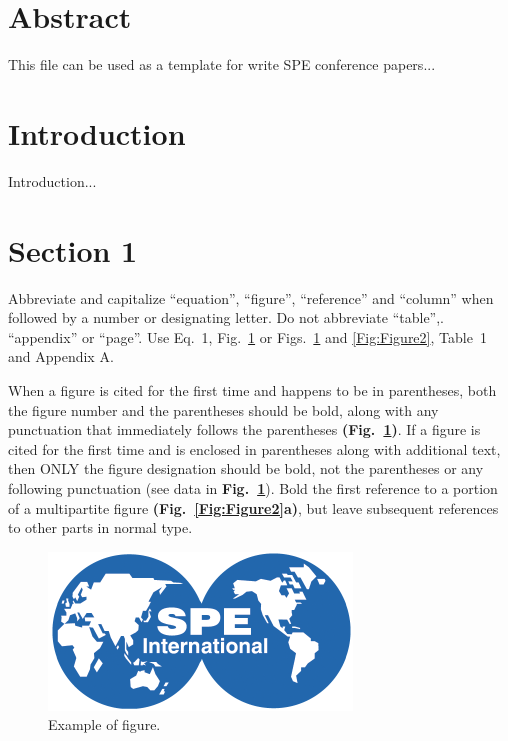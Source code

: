 \documentclass[10pt,twoside]{article}
\begin{document}
\section*{Abstract}
\label{Sec:Abstract}

This file can be used as a template for write SPE conference papers...

\section{Introduction}
\label{Sec:Intro}

Introduction...  \citep{RefWorks:25}

\section{Section 1}
\label{Sec:Section1}

Abbreviate and capitalize ``equation'', ``figure'', ``reference'' and ``column'' when followed by a number or designating letter. Do not abbreviate ``table'',. ``appendix'' or ``page''. Use Eq.~1, Fig.~\ref{Fig:Figure1} or Figs.~\ref{Fig:Figure1} and \ref{Fig:Figure2}, Table~1 and Appendix A.

When a figure is cited for the first time and happens to be in parentheses, both the figure number and the parentheses should be bold, along with any punctuation that immediately follows the parentheses \textbf{(Fig.~\ref{Fig:Figure1})}. If a figure is cited for the first time and is enclosed in parentheses along with additional text, then ONLY the figure designation should be bold, not the parentheses or any following punctuation (see data in \textbf{Fig.~\ref{Fig:Figure1}}). Bold the first reference to a portion of a multipartite figure \textbf{(Fig.~\ref{Fig:Figure2}a)}, but leave subsequent references to other parts in normal type.

\begin{figure}[h]
    \centering
    \includegraphics[width=0.30\linewidth]{./SPEInt.pdf}
    \caption{Example of figure.}
    \label{Fig:Figure1}
\end{figure}
\end{document}
